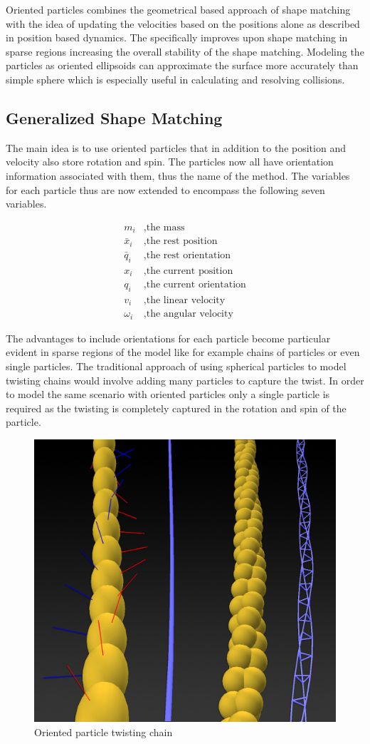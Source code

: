 Oriented particles combines the geometrical based approach of shape matching with the idea of updating the velocities based on the positions alone as described in position based dynamics. The specifically improves upon shape matching in sparse regions increasing the overall stability of the shape matching. Modeling the particles as oriented ellipsoids can approximate the surface more accurately than simple sphere which is especially useful in calculating and resolving collisions.

\subsection{Generalized Shape Matching}
The main idea is to use oriented particles that in addition to the position and velocity also store rotation and spin. The particles now all have orientation information associated with them, thus the name of the method. The variables for each particle thus are now extended to encompass the following seven variables.

\begin{align*}
m_i &, \text{the mass} \\
\bar{x}_i &, \text{the rest position} \\
\bar{q}_i &, \text{the rest orientation} \\
x_i &, \text{the current position} \\
q_i &, \text{the current orientation} \\
v_i &, \text{the linear velocity} \\
\omega_i &, \text{the angular velocity}
\end{align*}

The advantages to include orientations for each particle become particular evident in sparse regions of the model like for example chains of particles or even single particles. The traditional approach of using spherical particles to model twisting chains would involve adding many particles to capture the twist. In order to model the same scenario with oriented particles only a single particle is required as the twisting is completely captured in the rotation and spin of the particle.

\begin{figure}[htbp]
\centering
\includegraphics[width=.5\textwidth]{images/oriented_particle_twist_chain.png}
\caption{Oriented particle twisting chain}
\label{img:rigid_body}
\end{figure}

